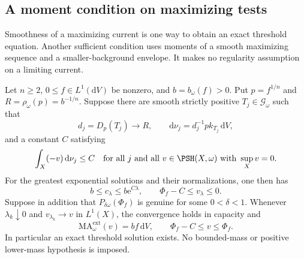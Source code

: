 \subsection{A moment condition on maximizing tests}

Smoothness of a maximizing current is one way to obtain an exact threshold equation. Another sufficient condition uses moments of a smooth maximizing sequence and a smaller-background envelope. It makes no regularity assumption on a limiting current.

\begin{theorem}\label{thm:gauduchon-moment-threshold}
Let $n\geq2$, $0\leq f\in L^1(\mathrm{d}V)$ be nonzero, and $b=b_\omega(f)>0$. Put $p=f^{1/n}$ and $R=\rho_\omega(p)=b^{-1/n}$. Suppose there are smooth strictly positive $T_j\in\mathscr G_\omega$ such that
\[
 d_j=D_p(T_j)\longrightarrow R,\qquad
 \mathrm{d}\nu_j=d_j^{-1}p k_{T_j}\,\mathrm{d}V,
\]
and a constant $C$ satisfying
\begin{equation}\label{eq:maximizing-gauduchon-moments}
 \int_X(-v)\,\mathrm{d}\nu_j\leq C
 \quad\text{for all }j\text{ and all }v\in\PSH(X,\omega)
                  \text{ with }\sup_Xv=0.
\end{equation}
For the greatest exponential solutions and their normalizations, one then has
\[
 b\leq c_\lambda\leq b\mathrm{e}^{C\lambda},\qquad
 \Phi_f-C\leq v_\lambda\leq0.
\]
Suppose in addition that $P_{\delta\omega}(\Phi_f)$ is genuine for some $0<\delta<1$. Whenever $\lambda_k\downarrow0$ and $v_{\lambda_k}\to v$ in $L^1(X)$, the convergence holds in capacity and
\[
 \mathrm{MA}^{\mathrm{ext}}_\omega(v)=bf\,\mathrm{d}V,
 \qquad \Phi_f-C\leq v\leq\Phi_f.
\]
In particular an exact threshold solution exists. No bounded-mass or positive lower-mass hypothesis is imposed.
\end{theorem}
